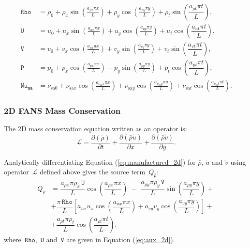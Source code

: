 \documentclass[10pt]{article}
\newcommand{\Diff}[2] {\dfrac{\partial( #1)}{\partial #2}}
\newcommand{\Rho}{\,\mathtt{Rho}}
\newcommand{\PP}{\,\mathtt{P}}
\newcommand{\U}{\,\mathtt{U}}
\newcommand{\V}{\,\mathtt{V}}
\newcommand{\Nu}{\,\mathtt{Nu_{sa}}}
\newcommand{\Lo}{\,\mathcal{L}}
\newcommand{\sa}{\nu_{\mathrm{sa}}}
\newcommand{\tsa}{\mathrm{sa}}
\newcommand{\brho}{\bar{\rho}}
\newcommand{\tu}{\tilde{u}}
\newcommand{\tv}{\tilde{v}}
\begin{document}
\begin{equation}
 \begin{split}
\label{eq:aux_2d}
\Rho &= \rho_{0}+ \rho_{x} \sin\left(\frac{a_{ \rho x} \pi x}{L}\right)+ \rho_{y} \cos\left(\frac{a_{ \rho y} \pi y}{L}\right)+ \rho_t \sin\left(\dfrac{a_{\rho t} \pi t}{L}\right),\\
\U &= u_{0}+u_{x} \sin\left(\frac{a_{u x} \pi x}{L}\right)+u_{y} \cos\left(\frac{a_{u y} \pi y}{L}\right) + u_t \cos\left(\dfrac{a_{u t} \pi t}{L}\right),\\
\V &= v_{0}+v_{x} \cos\left(\frac{a_{v x} \pi x}{L}\right)+v_{y} \sin\left(\frac{a_{v y} \pi y}{L}\right)+ v_t \sin\left(\dfrac{a_{v t} \pi t}{L}\right),\\
\PP &= p_{0}+p_{x} \cos\left(\frac{a_{p x} \pi x}{L}\right)+p_{y} \sin\left(\frac{a_{p y} \pi y}{L}\right)+ p_t \cos\left(\dfrac{a_{p t} \pi t}{L}\right),\\
\Nu &= \nu_{\tsa 0} +\nu_{\tsa x} \cos\left(\frac{a_{\sa x} \pi x}{L}\right) + \nu_{\tsa y} \cos\left(\frac{a_{\sa y} \pi y}{L}\right) + \nu_{\tsa t}\cos\left(\frac{a_{\sa t} \pi t}{L}\right).
\end{split}
\end{equation}


\subsubsection{2D FANS Mass Conservation}

The 2D mass conservation equation written as an operator is:
\begin{equation*}
  \Lo=\Diff{\brho }{t} +  \Diff{\brho \tu}{x}+\Diff{\brho \tv}{y}.
\end{equation*}

Analytically differentiating Equation (\ref{eq:manufactured_2d}) for $\brho$, $\tu$ and $\tv$ using operator $\Lo$ defined above gives  the source term~$Q_{\brho}$:
\begin{equation}
 \begin{split}
Q_{\brho} &= \dfrac{a_{\rho x} \pi \rho_x \U }{L}\cos\left(\dfrac{a_{\rho x} \pi x}{L}\right)\,\,-\,\,\dfrac{a_{\rho y} \pi \rho_y \V }{L}\sin\left(\dfrac{a_{\rho y} \pi y}{L}\right)+\\
&+\dfrac{\pi \Rho}{L}\left[a_{ux} u_x \cos\left(\dfrac{a_{ux} \pi x}{L}\right)+a_{vy} v_y \cos\left(\dfrac{a_{vy} \pi y}{L}\right)\right] +\\
&+\dfrac{a_{\rho t} \pi \rho_t }{L}\cos\left(\dfrac{a_{\rho t} \pi t}{L}\right).
 \end{split}
\end{equation}
where $\Rho,\,\U$ and $\V$ are given in Equation (\ref{eq:aux_2d}).
\end{document}
